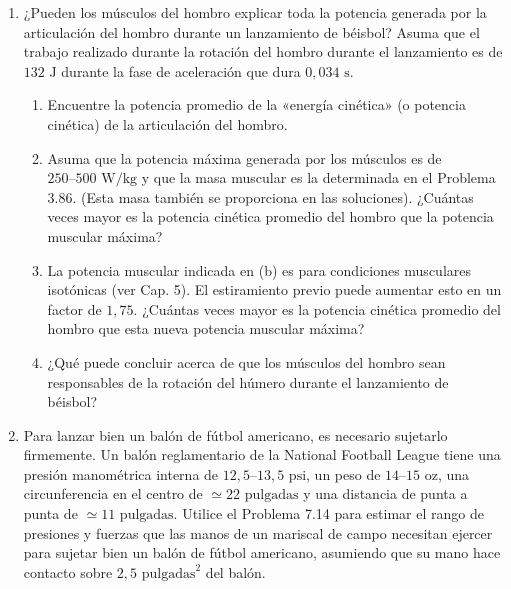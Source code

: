 \documentclass[12pt]{book}
\begin{document}
\begin{enumerate}
\item[3.87] ¿Pueden los músculos del hombro explicar toda la potencia generada por la articulación del hombro durante un lanzamiento de béisbol? Asuma que el trabajo realizado durante la rotación del hombro durante el lanzamiento es de $132\text{ J}$ durante la fase de aceleración que dura $0{,}034\text{ s}$.
\begin{enumerate}
\item[(a)] Encuentre la potencia promedio de la «energía cinética» (o potencia cinética) de la articulación del hombro.
\item[(b)] Asuma que la potencia máxima generada por los músculos es de $250\text{--}500\text{ W/kg}$ y que la masa muscular es la determinada en el Problema 3.86. (Esta masa también se proporciona en las soluciones). ¿Cuántas veces mayor es la potencia cinética promedio del hombro que la potencia muscular máxima?
\item[(c)] La potencia muscular indicada en (b) es para condiciones musculares isotónicas (ver Cap. 5). El estiramiento previo puede aumentar esto en un factor de $1{,}75$. ¿Cuántas veces mayor es la potencia cinética promedio del hombro que esta nueva potencia muscular máxima?
\item[(d)] ¿Qué puede concluir acerca de que los músculos del hombro sean responsables de la rotación del húmero durante el lanzamiento de béisbol?~\cite{ref121}
\end{enumerate}

\item[3.88] Para lanzar bien un balón de fútbol americano, es necesario sujetarlo firmemente. Un balón reglamentario de la National Football League tiene una presión manométrica interna de $12{,}5\text{--}13{,}5\text{ psi}$, un peso de $14\text{--}15\text{ oz}$, una circunferencia en el centro de $\simeq 22\text{ pulgadas}$ y una distancia de punta a punta de $\simeq 11\text{ pulgadas}$. Utilice el Problema 7.14 para estimar el rango de presiones y fuerzas que las manos de un mariscal de campo necesitan ejercer para sujetar bien un balón de fútbol americano, asumiendo que su mano hace contacto sobre $2{,}5\text{ pulgadas}^2$ del balón.


\end{enumerate}
\end{document}
